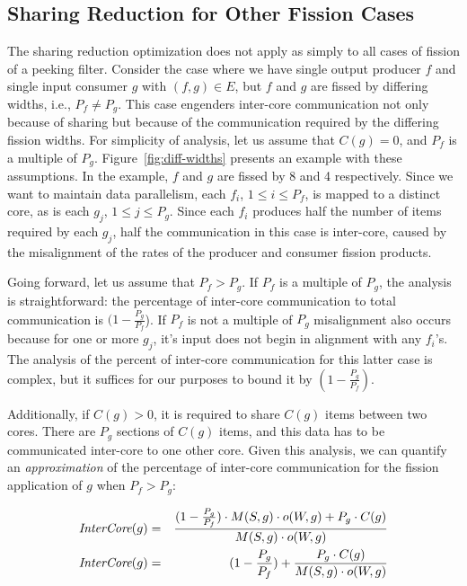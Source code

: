 \subsection{Sharing Reduction for Other Fission Cases}

The sharing reduction optimization does not apply as simply to all
cases of fission of a peeking filter.  Consider the case where we have
single output producer $f$ and single input consumer $g$ with $(f,g)
\in E$, but $f$ and $g$ are fissed by differing widths, i.e., $P_f \ne
P_g$.  This case engenders inter-core communication not only because
of sharing but because of the communication required by the differing
fission widths.  For simplicity of analysis, let us assume that $C(g)
= 0$, and $P_f$ is a multiple of $P_g$. Figure~\ref{fig:diff-widths}
presents an example with these assumptions.  In the example, $f$ and
$g$ are fissed by 8 and 4 respectively.  Since we want to maintain
data parallelism, each $f_i$, $1 \le i \le P_f$, is mapped to a
distinct core, as is each $g_j$, $1 \le j \le P_g$.  Since each $f_i$
produces half the number of items required by each $g_j$, half the
communication in this case is inter-core, caused by the misalignment
of the rates of the producer and consumer fission products.

Going forward, let us assume that $P_f > P_g$.  If $P_f$ is a multiple
of $P_g$, the analysis is straightforward: the percentage of inter-core
communication to total communication is $(1 - \frac{P_g}{P_f}$). If $P_f$ is
not a multiple of $P_g$ misalignment also occurs because for one or
more $g_j$, it's input does not begin in alignment with any $f_i$'s.
The analysis of the percent of inter-core communication for this latter
case is complex, but it suffices for our purposes to bound it by
$(1 - \frac{P_g}{P_f})$.

Additionally, if $C(g) > 0$, it is required to share $C(g)$ items
between two cores.  There are $P_g$ sections of $C(g)$ items, and this
data has to be communicated inter-core to one other core.  Given this
analysis, we can quantify an {\it approximation} of the percentage of
inter-core communication for the fission application of $g$ when $P_f
> P_g$:

\begin{align}
\mbox{\it InterCore}(g) & = & \frac{(1 - \frac{P_g}{P_f}) \cdot M(S, g) \cdot o(W, g) +
P_g \cdot C(g)}{M(S, g) \cdot o(W, g)} \\
\label{eq:diff-fiss}
\mbox{\it InterCore}(g) & = & (1 - \frac{P_g}{P_f}) +
\frac{P_g \cdot C(g)}{M(S, g) \cdot o(W, g)}
\end{align}

